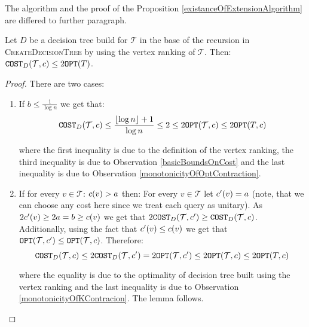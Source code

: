 The algorithm and the proof of the Proposition \ref{existanceOfExtensionAlgorithm} are differed to further paragraph. 

\begin{lemma}\label{baseOfRecursion}
    Let $D$ be a decision tree build for $\mathcal{T}$ in the base of the recursion in \textsc{CreateDecisionTree} by using the vertex ranking of $\mathcal{T}$. Then:
$
\texttt{COST}_{D}\mathopen{}\left( \mathcal{T},c \right)\leq 2\texttt{OPT}(T)
$.
\begin{proof}
    There are two cases:
    \begin{enumerate}
        \item If $b\leq \frac{1}{\log n}$ we get that:
$$
\texttt{COST}_{D}\mathopen{}\left( \mathcal{T},c \right)\leq\frac{\mathopen{}\left\lfloor \log n \right\rfloor+1}{\log n}\leq 2\leq 2\texttt{OPT}(\mathcal{T},c)\leq 2\texttt{OPT}(T,c)
$$

where the first inequality is due to the definition of the vertex ranking, the third inequality is due to Observation \ref{basicBoundsOnCost} and the last inequality is due to Observation
\ref{monotonicityOfOptContraction}.
\item 
If for every ${v\in \mathcal{T}} $: $c\mathopen{}\left( v \right)> a$ then: For every $v\in \mathcal{T}$ let $c'\mathopen{}\left( v \right)=a$ (note, that we can choose any cost here since we treat each query as unitary). As $2c'\mathopen{}\left( v \right)\geq2a=b \geq c\mathopen{}\left( v \right)$ we get that $2\texttt{COST}_D\mathopen{}\left( \mathcal{T}, c' \right)\geq \texttt{COST}_D\mathopen{}\left( \mathcal{T}, c \right)$. Additionally, using the fact that $c'\mathopen{}\left( v \right) \leq c\mathopen{}\left( v \right)$ we get that $\texttt{OPT}\mathopen{}\left( \mathcal{T}, c' \right)\leq \texttt{OPT}\mathopen{}\left( \mathcal{T}, c \right)$. Therefore:
$$
\texttt{COST}_D\mathopen{}\left( \mathcal{T}, c \right)\leq 2\texttt{COST}_D\mathopen{}\left( \mathcal{T}, c' \right)=2\texttt{OPT}\mathopen{}\left( \mathcal{T}, c' \right)\leq 2\texttt{OPT}\mathopen{}\left( \mathcal{T}, c \right)\leq 2\texttt{OPT}\mathopen{}\left( T, c \right)
$$

where the equality is due to the optimality of decision tree built using the vertex ranking and the last inequality is due to Observation \ref{monotonicityOfKContracion}. The lemma follows.
    \end{enumerate}
\end{proof}
\end{lemma}

